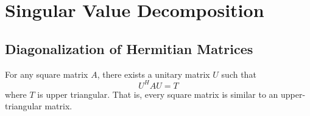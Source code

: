 \chapter{Singular Value Decomposition}


\section{Diagonalization of Hermitian Matrices}

\begin{lemma}
For any square matrix $A$, there exists a unitary matrix $U$ such that
\begin{equation*}
U^H A U = T
\end{equation*}
where $T$ is upper triangular.
That is, every square matrix is similar to an upper-triangular matrix.
\end{lemma}

